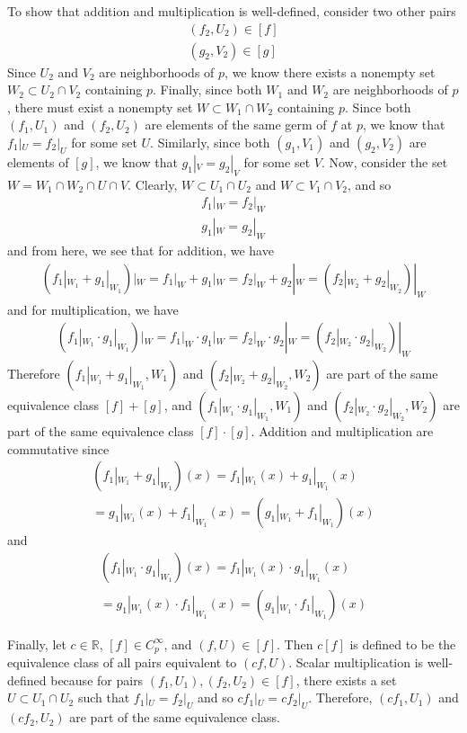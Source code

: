 \documentclass{article}
\newcommand{\R}{\mathbb{R}}
\newcommand{\Cinfty}{C^{\infty}}
\begin{document}
	To show that addition and multiplication is well-defined, consider two other pairs
	\begin{gather*}
		(f_2, U_2) \in [f] \\
		(g_2, V_2) \in [g]
	\end{gather*}
	Since $U_2$ and $V_2$ are neighborhoods of $p$, we know there exists a nonempty set $W_2 \subset U_2 \cap V_2$ containing $p$. Finally, since both $W_1$ and $W_2$ are neighborhoods of $p$, there must exist a nonempty set $W \subset W_1 \cap W_2$ containing $p$. Since both $(f_1, U_1)$ and $(f_2, U_2)$ are elements of the same germ of $f$ at $p$, we know that $f_1|_U = f_2|_U$ for some set $U$. Similarly, since both $(g_1, V_1)$ and $(g_2, V_2)$ are elements of $[g]$, we know that $g_1|_V = g_2|_V$ for some set $V$. Now, consider the set $W = W_1 \cap W_2 \cap U \cap V$. Clearly, $W \subset U_1 \cap U_2$ and $W \subset V_1 \cap V_2$, and so
	\begin{gather*}
		f_1|_W = f_2|_W \\
		g_1|_W = g_2|_W
	\end{gather*}
	and from here, we see that for addition, we have
	\begin{gather*}
		\left( f_1|_{W_1} + g_1|_{W_1} \right)|_W = f_1|_W + g_1|_W = f_2|_W + g_2|_W
		= \left( f_2|_{W_2} + g_2|_{W_2} \right)|_W
	\end{gather*}
	and for multiplication, we have
	\begin{gather*}
		\left( f_1|_{W_1} \cdot g_1|_{W_1} \right)|_W = f_1|_W \cdot g_1|_W
		= f_2|_W \cdot g_2|_W = \left( f_2|_{W_2} \cdot g_2|_{W_2} \right)|_W	
	\end{gather*}
	Therefore $(f_1|_{W_1} + g_1|_{W_1}, W_1)$ and $(f_2|_{W_2} + g_2|_{W_2}, W_2)$ are part of the same equivalence class $[f] + [g]$, and $(f_1|_{W_1} \cdot g_1|_{W_1}, W_1)$ and $(f_2|_{W_2} \cdot g_2|_{W_2}, W_2)$ are part of the same equivalence class $[f] \cdot [g]$. Addition and multiplication are commutative since
	\begin{gather*}
		\left( f_1|_{W_1} + g_1|_{W_1} \right)(x) = f_1|_{W_1}(x) + g_1|_{W_1}(x) \\
		= g_1|_{W_1}(x) + f_1|_{W_1}(x) = \left( g_1|_{W_1} + f_1|_{W_1} \right)(x) 
	\end{gather*}
	and
	\begin{gather*}
		\left( f_1|_{W_1} \cdot g_1|_{W_1} \right)(x) = f_1|_{W_1}(x) \cdot g_1|_{W_1}(x) \\
		= g_1|_{W_1}(x) \cdot f_1|_{W_1}(x) = \left( g_1|_{W_1} \cdot f_1|_{W_1} \right)(x) 
	\end{gather*}
	
	Finally, let $c \in \R$, $[f] \in \Cinfty_p$, and $(f, U) \in [f]$. Then $c [f]$ is defined to be the equivalence class of all pairs equivalent to $(c f, U)$. Scalar multiplication is well-defined because for pairs $(f_1, U_1), (f_2, U_2) \in [f]$, there exists a set $U \subset U_1 \cap U_2$ such that $f_1|_U = f_2|_U$ and so $cf_1|_U = cf_2|_U$. Therefore, $(cf_1, U_1)$ and $(cf_2, U_2)$ are part of the same equivalence class.
	
\end{document}
